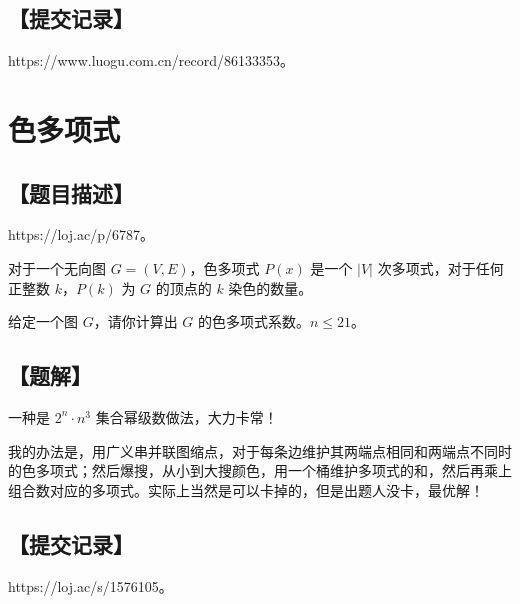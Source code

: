 \documentclass[UTF8,12pt,a4paper]{ctexart}
\begin{document}
	\subsection*{【提交记录】}
	
	https://www.luogu.com.cn/record/86133353。
	
	
	\section*{色多项式}
	
	\subsection*{【题目描述】}
	
	https://loj.ac/p/6787。
	
	对于一个无向图 $G = (V, E)$，色多项式 $P(x)$ 是一个 $|V|$ 次多项式，对于任何正整数 $k$，$P(k)$ 为 $G$ 的顶点的 $k$ 染色的数量。
	
	给定一个图 $G$，请你计算出 $G$ 的色多项式系数。$n\le 21$。
	
	\subsection*{【题解】}
	
	一种是 $2^n\cdot n^3$ 集合幂级数做法，大力卡常！
	
	我的办法是，用广义串并联图缩点，对于每条边维护其两端点相同和两端点不同时的色多项式；然后爆搜，从小到大搜颜色，用一个桶维护多项式的和，然后再乘上组合数对应的多项式。实际上当然是可以卡掉的，但是出题人没卡，最优解！
	
	\subsection*{【提交记录】}
	
	https://loj.ac/s/1576105。
	
	
	
	
\end{document}

